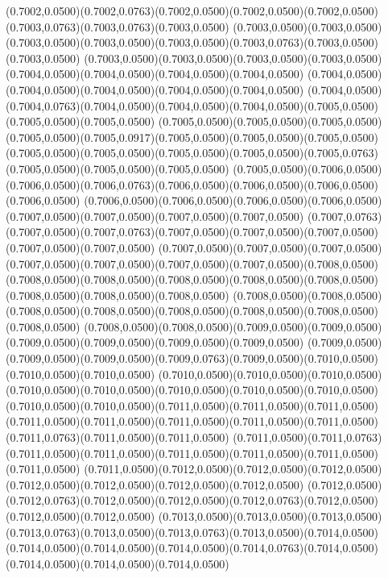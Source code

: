 (0.7002,0.0500)(0.7002,0.0763)(0.7002,0.0500)(0.7002,0.0500)(0.7002,0.0500)(0.7003,0.0763)(0.7003,0.0763)(0.7003,0.0500)
(0.7003,0.0500)(0.7003,0.0500)(0.7003,0.0500)(0.7003,0.0500)(0.7003,0.0500)(0.7003,0.0763)(0.7003,0.0500)(0.7003,0.0500)
(0.7003,0.0500)(0.7003,0.0500)(0.7003,0.0500)(0.7003,0.0500)(0.7004,0.0500)(0.7004,0.0500)(0.7004,0.0500)(0.7004,0.0500)
(0.7004,0.0500)(0.7004,0.0500)(0.7004,0.0500)(0.7004,0.0500)(0.7004,0.0500)
\PST@Solid(0.7004,0.0500)(0.7004,0.0763)(0.7004,0.0500)(0.7004,0.0500)(0.7004,0.0500)(0.7005,0.0500)(0.7005,0.0500)(0.7005,0.0500)
(0.7005,0.0500)(0.7005,0.0500)(0.7005,0.0500)(0.7005,0.0500)(0.7005,0.0917)(0.7005,0.0500)(0.7005,0.0500)(0.7005,0.0500)
(0.7005,0.0500)(0.7005,0.0500)(0.7005,0.0500)(0.7005,0.0500)(0.7005,0.0763)(0.7005,0.0500)(0.7005,0.0500)(0.7005,0.0500)
(0.7005,0.0500)(0.7006,0.0500)(0.7006,0.0500)(0.7006,0.0763)(0.7006,0.0500)(0.7006,0.0500)(0.7006,0.0500)(0.7006,0.0500)
(0.7006,0.0500)(0.7006,0.0500)(0.7006,0.0500)(0.7006,0.0500)(0.7007,0.0500)(0.7007,0.0500)(0.7007,0.0500)(0.7007,0.0500)
(0.7007,0.0763)(0.7007,0.0500)(0.7007,0.0763)(0.7007,0.0500)(0.7007,0.0500)(0.7007,0.0500)(0.7007,0.0500)(0.7007,0.0500)
(0.7007,0.0500)(0.7007,0.0500)(0.7007,0.0500)(0.7007,0.0500)(0.7007,0.0500)(0.7007,0.0500)(0.7007,0.0500)(0.7008,0.0500)
(0.7008,0.0500)(0.7008,0.0500)(0.7008,0.0500)(0.7008,0.0500)(0.7008,0.0500)(0.7008,0.0500)(0.7008,0.0500)(0.7008,0.0500)
(0.7008,0.0500)(0.7008,0.0500)(0.7008,0.0500)(0.7008,0.0500)(0.7008,0.0500)(0.7008,0.0500)(0.7008,0.0500)(0.7008,0.0500)
(0.7008,0.0500)(0.7008,0.0500)(0.7009,0.0500)(0.7009,0.0500)(0.7009,0.0500)(0.7009,0.0500)(0.7009,0.0500)(0.7009,0.0500)
(0.7009,0.0500)(0.7009,0.0500)(0.7009,0.0500)(0.7009,0.0763)(0.7009,0.0500)(0.7010,0.0500)(0.7010,0.0500)(0.7010,0.0500)
(0.7010,0.0500)(0.7010,0.0500)(0.7010,0.0500)(0.7010,0.0500)(0.7010,0.0500)(0.7010,0.0500)(0.7010,0.0500)(0.7010,0.0500)
(0.7010,0.0500)(0.7010,0.0500)(0.7011,0.0500)(0.7011,0.0500)(0.7011,0.0500)
\PST@Solid(0.7011,0.0500)(0.7011,0.0500)(0.7011,0.0500)(0.7011,0.0500)(0.7011,0.0500)(0.7011,0.0763)(0.7011,0.0500)(0.7011,0.0500)
(0.7011,0.0500)(0.7011,0.0763)(0.7011,0.0500)(0.7011,0.0500)(0.7011,0.0500)(0.7011,0.0500)(0.7011,0.0500)(0.7011,0.0500)
(0.7011,0.0500)(0.7012,0.0500)(0.7012,0.0500)(0.7012,0.0500)(0.7012,0.0500)(0.7012,0.0500)(0.7012,0.0500)(0.7012,0.0500)
(0.7012,0.0500)(0.7012,0.0763)(0.7012,0.0500)(0.7012,0.0500)(0.7012,0.0763)(0.7012,0.0500)(0.7012,0.0500)(0.7012,0.0500)
(0.7013,0.0500)(0.7013,0.0500)(0.7013,0.0500)(0.7013,0.0763)(0.7013,0.0500)(0.7013,0.0763)(0.7013,0.0500)(0.7014,0.0500)
(0.7014,0.0500)(0.7014,0.0500)(0.7014,0.0500)(0.7014,0.0763)(0.7014,0.0500)(0.7014,0.0500)(0.7014,0.0500)(0.7014,0.0500)
